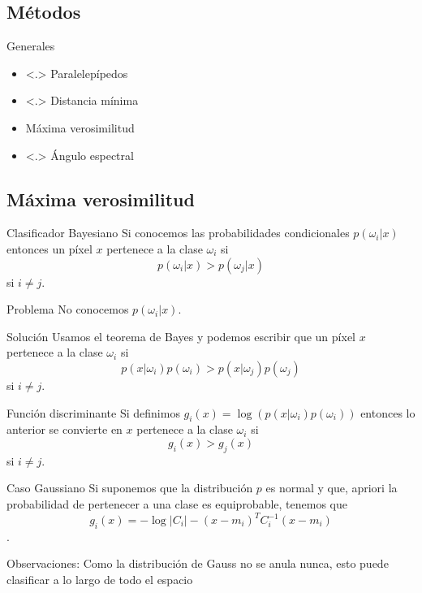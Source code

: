 \documentclass[]{beamer}
\begin{document}
\subsection{Métodos}
\begin{frame}{\subsecname}
  \begin{block}{Generales}
    \begin{itemize}
      \item<.> Paralelepípedos
      \item<.> Distancia mínima
      \item<1> Máxima verosimilitud
      \item<.> Ángulo espectral
    \end{itemize}
  \end{block}
\end{frame}

\subsection{Máxima verosimilitud}

\begin{frame}{\subsecname}
  \begin{block}{Clasificador Bayesiano}
    Si conocemos las probabilidades condicionales $p(\omega_i|x)$ entonces un píxel $x$ pertenece a la clase $\omega_i$ si $$p(\omega_i|x)>p(\omega_j|x)$$ si $i \neq j$.
  \end{block}
  \pause
  \begin{alertblock}{Problema}
    No conocemos $p(\omega_i|x)$.
  \end{alertblock}
\end{frame}

\begin{frame}{\subsecname}
  \begin{block}{Solución}
    Usamos el teorema de Bayes y podemos escribir que un píxel $x$ pertenece a la clase $\omega_i$ si $$p(x|\omega_i)p(\omega_i)>p(x|\omega_j)p(\omega_j)$$ si $i \neq j$.
  \end{block}
  \pause
  \begin{block}{Función discriminante}
    Si definimos $g_i(x) = \log (p(x|\omega_i)p(\omega_i))$ entonces lo anterior se convierte en $x$ pertenece a la clase $\omega_i$ si $$g_i(x)>g_j(x)$$ si $i \neq j$.
  \end{block}
\end{frame}

\begin{frame}{\subsecname}
  \begin{block}{Caso Gaussiano}
    Si suponemos que la distribución $p$ es normal y que, apriori la probabilidad de pertenecer a una clase es equiprobable, tenemos que
    $$g_i(x) = -\log |C_i| - (x-m_i)^T C_i^{-1} (x-m_i)$$.
  \end{block}
  \pause
  \begin{alertblock}{Observaciones:}
    Como la distribución de Gauss no se anula nunca, esto puede clasificar a lo largo de todo el espacio
  \end{alertblock}
\end{frame}
\end{document}
